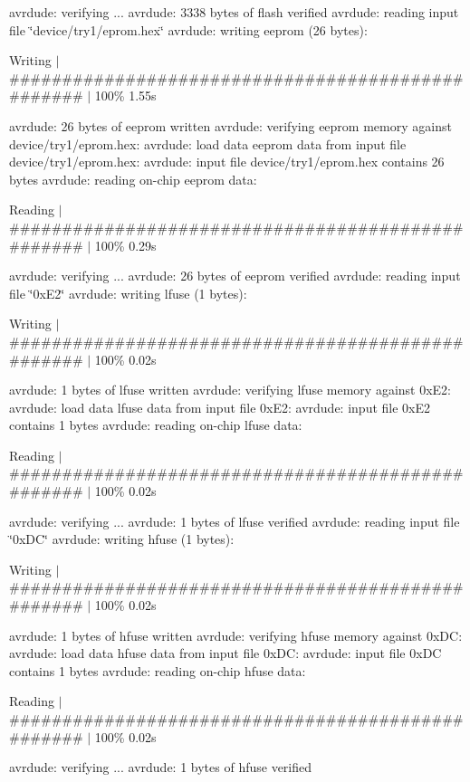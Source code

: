 avrdude\-: verifying ... avrdude\-: 3338 bytes of flash verified avrdude\-: reading input file \char`\"{}device/try1/eprom.\-hex\char`\"{} avrdude\-: writing eeprom (26 bytes)\-:

Writing $\vert$ \#\#\#\#\#\#\#\#\#\#\#\#\#\#\#\#\#\#\#\#\#\#\#\#\#\#\#\#\#\#\#\#\#\#\#\#\#\#\#\#\#\#\#\#\#\#\#\#\#\# $\vert$ 100\% 1.\-55s

avrdude\-: 26 bytes of eeprom written avrdude\-: verifying eeprom memory against device/try1/eprom.\-hex\-: avrdude\-: load data eeprom data from input file device/try1/eprom.\-hex\-: avrdude\-: input file device/try1/eprom.\-hex contains 26 bytes avrdude\-: reading on-\/chip eeprom data\-:

Reading $\vert$ \#\#\#\#\#\#\#\#\#\#\#\#\#\#\#\#\#\#\#\#\#\#\#\#\#\#\#\#\#\#\#\#\#\#\#\#\#\#\#\#\#\#\#\#\#\#\#\#\#\# $\vert$ 100\% 0.\-29s

avrdude\-: verifying ... avrdude\-: 26 bytes of eeprom verified avrdude\-: reading input file \char`\"{}0x\-E2\char`\"{} avrdude\-: writing lfuse (1 bytes)\-:

Writing $\vert$ \#\#\#\#\#\#\#\#\#\#\#\#\#\#\#\#\#\#\#\#\#\#\#\#\#\#\#\#\#\#\#\#\#\#\#\#\#\#\#\#\#\#\#\#\#\#\#\#\#\# $\vert$ 100\% 0.\-02s

avrdude\-: 1 bytes of lfuse written avrdude\-: verifying lfuse memory against 0x\-E2\-: avrdude\-: load data lfuse data from input file 0x\-E2\-: avrdude\-: input file 0x\-E2 contains 1 bytes avrdude\-: reading on-\/chip lfuse data\-:

Reading $\vert$ \#\#\#\#\#\#\#\#\#\#\#\#\#\#\#\#\#\#\#\#\#\#\#\#\#\#\#\#\#\#\#\#\#\#\#\#\#\#\#\#\#\#\#\#\#\#\#\#\#\# $\vert$ 100\% 0.\-02s

avrdude\-: verifying ... avrdude\-: 1 bytes of lfuse verified avrdude\-: reading input file \char`\"{}0x\-D\-C\char`\"{} avrdude\-: writing hfuse (1 bytes)\-:

Writing $\vert$ \#\#\#\#\#\#\#\#\#\#\#\#\#\#\#\#\#\#\#\#\#\#\#\#\#\#\#\#\#\#\#\#\#\#\#\#\#\#\#\#\#\#\#\#\#\#\#\#\#\# $\vert$ 100\% 0.\-02s

avrdude\-: 1 bytes of hfuse written avrdude\-: verifying hfuse memory against 0x\-D\-C\-: avrdude\-: load data hfuse data from input file 0x\-D\-C\-: avrdude\-: input file 0x\-D\-C contains 1 bytes avrdude\-: reading on-\/chip hfuse data\-:

Reading $\vert$ \#\#\#\#\#\#\#\#\#\#\#\#\#\#\#\#\#\#\#\#\#\#\#\#\#\#\#\#\#\#\#\#\#\#\#\#\#\#\#\#\#\#\#\#\#\#\#\#\#\# $\vert$ 100\% 0.\-02s

avrdude\-: verifying ... avrdude\-: 1 bytes of hfuse verified

